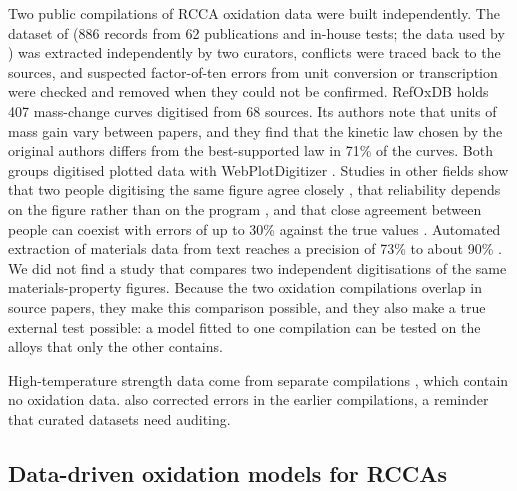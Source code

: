 Two public compilations of RCCA oxidation data were built independently. The dataset of
\citet{lin2026dataset} (886 records from 62 publications and in-house tests; the data used by
\citet{gorsse2025ml}) was extracted independently by two curators, conflicts were traced back to the
sources, and suspected factor-of-ten errors from unit conversion or transcription were checked and
removed when they could not be confirmed. RefOxDB \citep{mishra2024refoxdb} holds 407 mass-change
curves digitised from 68 sources. Its authors note that units of mass gain vary between papers, and
they find that the kinetic law chosen by the original authors differs from the best-supported law
in 71\% of the curves. Both groups digitised plotted data with WebPlotDigitizer
\citep{rohatgi2018webplotdigitizer}. Studies in other fields show that two people digitising the same
figure agree closely \citep{drevon2017intercoder}, that reliability depends on the figure rather than
on the program \citep{moeyaert2016reliability}, and that close agreement between people can coexist
with errors of up to 30\% against the true values \citep{burda2017estimating}. Automated extraction
of materials data from text reaches a precision of 73\% \citep{court2018auto} to about 90\%
\citep{polak2024extracting}. We did not find a study that compares two independent digitisations of
the same materials-property figures. Because the two oxidation compilations overlap in source papers,
they make this comparison possible, and they also make a true external test possible: a model fitted
to one compilation can be tested on the alloys that only the other contains.

High-temperature strength data come from separate compilations
\citep{couzinie2018comprehensive,gorsse2018database,borg2020expanded}, which contain no oxidation
data. \citet{borg2020expanded} also corrected errors in the earlier compilations, a reminder that
curated datasets need auditing.

\subsection{Data-driven oxidation models for RCCAs}

